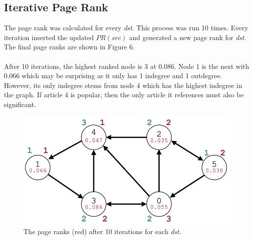 \documentclass[journal]{IEEEtran}
\begin{document}
\subsection{Iterative Page Rank}
The page rank was calculated for every \emph{dst}. This process was run 10 times. Every iteration inserted the updated $PR(src)$ and generated a new page rank for \emph{dst}. The final page ranks are shown in Figure 6.\\\\
After 10 iterations, the highest ranked node is 3 at 0.086. Node 1 is the next with 0.066 which may be surprising as it only has 1 indegree and 1 outdegree. However, its only indegree stems from node 4 which has the highest indegree in the graph. If article 4 is popular, then the only article it references must also be significant.\\
\begin{figure}[h!]
\begin{center}\includegraphics[scale=0.2]{6.png}\end{center}
\caption{The page ranks (red) after 10 iterations for each \emph{dst}.}
\end{figure}
\end{document}
